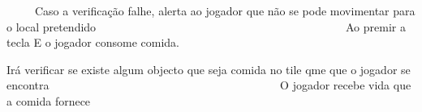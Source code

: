 ~\newline
~\newline
~\newline
 Caso a verificação falhe, alerta ao jogador que não se pode movimentar para o local pretendido ~\newline
~\newline
~\newline
~\newline
~\newline
~\newline
~\newline
~\newline
~\newline
~\newline
~\newline
~\newline
~\newline
~\newline
~\newline
~\newline
~\newline
~\newline
~\newline
~\newline
~\newline
~\newline
~\newline
~\newline
~\newline
~\newline
 Ao premir a tecla E o jogador consome comida.

Irá verificar se existe algum objecto que seja comida no tile qme que o jogador se encontra ~\newline
~\newline
~\newline
~\newline
~\newline
~\newline
~\newline
~\newline
~\newline
~\newline
~\newline
~\newline
~\newline
~\newline
~\newline
~\newline
~\newline
~\newline
~\newline
~\newline
~\newline
~\newline
~\newline
~\newline
 O jogador recebe vida que a comida fornece

